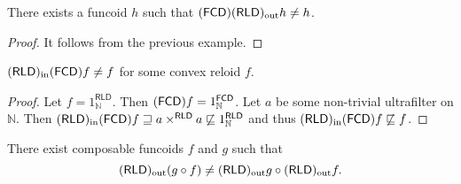 \begin{example}
There exists a funcoid $h$ such that $(\mathsf{FCD})(\mathsf{RLD})_{\mathrm{out}} h\ne h$.\end{example}
\begin{proof}
It follows from the previous example.\end{proof}
\begin{example}
$(\mathsf{RLD})_{\mathrm{in}}(\mathsf{FCD}) f\ne f$ for some convex reloid $f$.\end{example}
\begin{proof}
Let $f=1_{\mathbb{N}}^{\mathsf{RLD}}$. Then $(\mathsf{FCD}) f=1_{\mathbb{N}}^{\mathsf{FCD}}$.
Let $a$ be some non-trivial ultrafilter on $\mathbb{N}$. Then $(\mathsf{RLD})_{\mathrm{in}}(\mathsf{FCD}) f\sqsupseteq a\times^{\mathsf{RLD}}a\not\sqsubseteq1_{\mathbb{N}}^{\mathsf{RLD}}$
and thus $(\mathsf{RLD})_{\mathrm{in}}(\mathsf{FCD}) f\not\sqsubseteq f$.\end{proof}
\begin{example}
There exist composable funcoids $f$ and $g$ such that
\[
(\mathsf{RLD})_{\mathrm{out}}(g\circ f)\ne(\mathsf{RLD})_{\mathrm{out}} g\circ(\mathsf{RLD})_{\mathrm{out}} f.
\]
\end{example}

